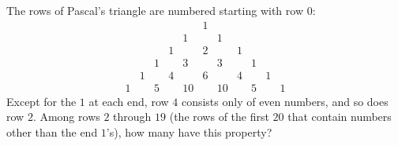 The rows of Pascal's triangle are numbered starting with row $0$:
\[
\begin{array}{ccccccccccc}
&&&&&1&&&&&\\
&&&&1&&1&&&&\\
&&&1&&2&&1&&&\\
&&1&&3&&3&&1&&\\
&1&&4&&6&&4&&1&\\
1&&5&&10&&10&&5&&1
\end{array}
\]
Except for the $1$ at each end, row $4$ consists only of even numbers, and so does row $2$. Among rows $2$ through $19$ (the rows of the first $20$ that contain numbers other than the end $1$'s), how many have this property?
